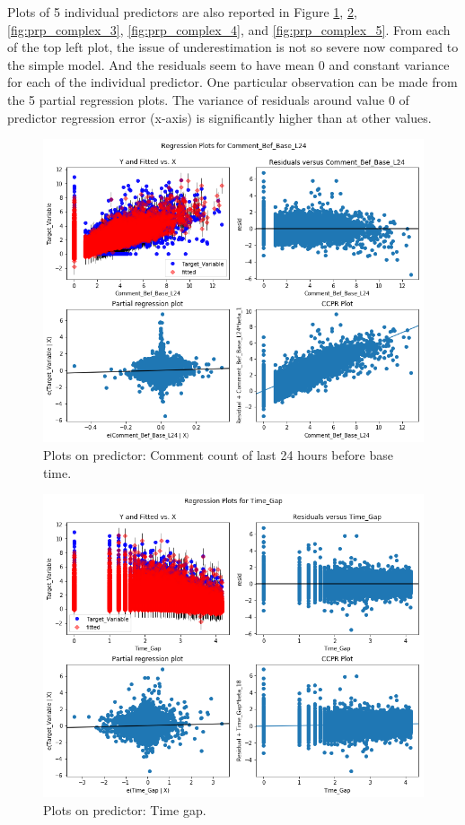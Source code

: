 \documentclass[]{article}
\begin{document}
Plots of 5 individual predictors are also reported in Figure \ref{fig:prp_complex_1}, \ref{fig:prp_complex_2}, \ref{fig:prp_complex_3}, \ref{fig:prp_complex_4}, and \ref{fig:prp_complex_5}. From each of the top left plot, the issue of underestimation is not so severe now compared to the simple model. And the residuals seem to have mean 0 and constant variance for each of the individual predictor. One particular observation can be made from the 5 partial regression plots. The variance of residuals around value 0 of predictor regression error (x-axis) is significantly higher than at other values. 
%
\begin{figure}[hbtp]
	\centering
	\includegraphics[width=.8\columnwidth]{../Figures/prp_complex_1}
	\caption{Plots on predictor: Comment count of last 24 hours before base time.}
	\label{fig:prp_complex_1}
\end{figure}
%
%
\begin{figure}[hbtp]
	\centering
	\includegraphics[width=.8\columnwidth]{../Figures/prp_complex_2}
	\caption{Plots on predictor: Time gap.}
	\label{fig:prp_complex_2}
\end{figure}
\end{document}
